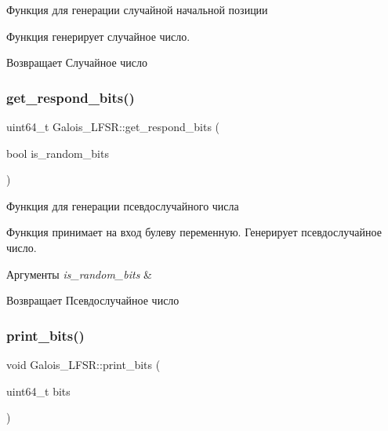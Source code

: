 Функция для генерации случайной начальной позиции 

Функция генерирует случайное число.

\begin{DoxyReturn}{Возвращает}
Случайное число 
\end{DoxyReturn}
\mbox{\label{classGalois__LFSR_a1ceda4d66d840ff703cd14a3919b2f8b}} 
\subsubsection{\texorpdfstring{get\+\_\+respond\+\_\+bits()}{get\_respond\_bits()}}
{\footnotesize\ttfamily uint64\+\_\+t Galois\+\_\+\+L\+F\+S\+R\+::get\+\_\+respond\+\_\+bits (\begin{DoxyParamCaption}\item[{bool}]{is\+\_\+random\+\_\+bits }\end{DoxyParamCaption})}



Функция для генерации псевдослучайного числа 

Функция принимает на вход булеву переменную. Генерирует псевдослучайное число.


\begin{DoxyParams}{Аргументы}
{\em is\+\_\+random\+\_\+bits} & \\
\hline
\end{DoxyParams}
\begin{DoxyReturn}{Возвращает}
Псевдослучайное число 
\end{DoxyReturn}
\mbox{\label{classGalois__LFSR_a7a2d2fa3f9f7973cb520d92267f58f4d}} 
\subsubsection{\texorpdfstring{print\+\_\+bits()}{print\_bits()}}
{\footnotesize\ttfamily void Galois\+\_\+\+L\+F\+S\+R\+::print\+\_\+bits (\begin{DoxyParamCaption}\item[{uint64\+\_\+t}]{bits }\end{DoxyParamCaption})}



